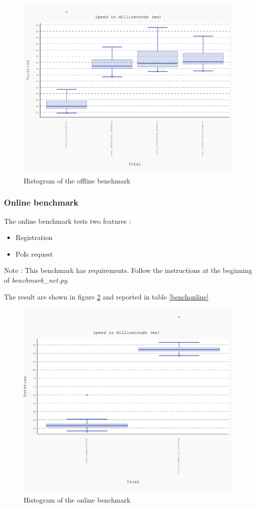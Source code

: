 \documentclass[10pt,conference,compsocconf]{IEEEtran}
\begin{document}
\begin{figure}
    \includegraphics[width=\columnwidth]{benchmark.png} 
    \caption{Histogram of the offline benchmark}
    \label{benchoffline_fig}
\end{figure}

\subsubsection{Online benchmark}
The online benchmark tests two features :
\begin{itemize}
    \item Registration
    \item PoIs request
\end{itemize}
Note : This benchmark has requirements. Follow the instructions at the beginning of \textit{benchmark\_net.py}.

The result are shown in figure \ref{benchonline_fig}
and reported in table \ref{benchonline}
\begin{figure}
    \includegraphics[width=\columnwidth]{benchmark_net.png}
    \caption{Histogram of the online benchmark}
    \label{benchonline_fig}
\end{figure}
\end{document}
